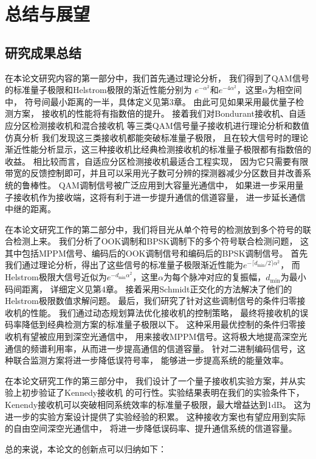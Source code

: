 \chapter{总结与展望}
\section{研究成果总结}
在本论文研究内容的第一部分中，我们首先通过理论分析，
我们得到了QAM信号的标准量子极限和Helstrom极限的渐近性能分别为
$e^{-\alpha^2}$和$e^{-4\alpha^2}$，这里$\alpha$为相空间中，
符号间最小距离的一半，具体定义见第3章。
由此可见如果采用最优量子检测方案，
接收机的性能将有指数倍的提升。
接着我们对Bondurant接收机、自适应分区检测接收机和混合接收机
等三类QAM信号量子接收机进行理论分析和数值仿真分析
我们发现这三类接收机都能突破标准量子极限，
且在较大信号时的理论渐近性能分析显示，这三种接收机比经典检测接收机的标准量子极限都有指数倍的收益。
相比较而言，自适应分区检测接收机最适合工程实现，
因为它只需要有限带宽的反馈控制即可，并且可以采用光子数可分辨的探测器减少分区数目并改善系统的鲁棒性。
QAM调制信号被广泛应用到大容量光通信中，
如果进一步采用量子接收机作为接收端，这将有利于进一步提升通信的信道容量，
进一步延长通信中继的距离。

在本论文研究工作的第二部分中，我们将目光从单个符号的检测放到多个符号的联合检测上来。
我们分析了OOK调制和BPSK调制下的多个符号联合检测问题，
这其中包括MPPM信号、编码后的OOK调制信号和编码后的BPSK调制信号。
首先我们通过理论分析，得出了这些信号的标准量子极限渐近性能为$e^{-\lceil d_{\min}/2\rceil \alpha^2}$，
而Helstrom极限大信号近似为$e^{-d_{\min} \alpha^2}$，这里$\alpha$为每个脉冲对应的复振幅，$d_{\min}$为最小码间距离，
详细定义见第4章。
接着采用Schmidt正交化的方法解决了他们的Helstrom极限数值求解问题。
最后，我们研究了针对这些调制信号的条件归零接收机的性能。
我们通过动态规划算法优化接收机的控制策略，
最终将接收机的误码率降低到经典检测方案的标准量子极限以下。
这种采用最优控制的条件归零接收机有望被应用到深空光通信中，
用来接收MPPM信号。这将极大地提高深空光通信的频谱利用率，从而进一步提高通信的信道容量。
针对二进制编码信号，这种联合监测方案将进一步降低误符号率，
能够进一步提高系统的能量效率。

在本论文研究工作的第三部分中，
我们设计了一个量子接收机实验方案，并从实验上初步验证了Kennedy接收机
的可行性。实验结果表明在我们的实验条件下，
Kenendy接收机可以突破相同系统效率的标准量子极限，最大增益达到1dB。
这为进一步的实验方案设计提供了实验经验的积累。
这种接收方案也有望应用到实际的自由空间深空光通信中，
将进一步降低误码率、提升通信系统的信道容量。

总的来说，本论文的创新点可以归纳如下：

